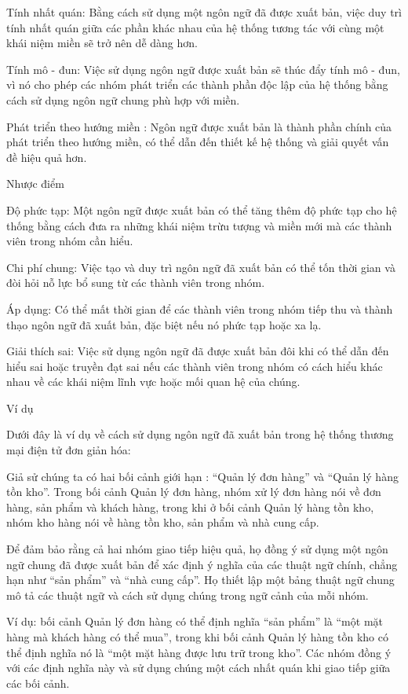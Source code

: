 Tính nhất quán: Bằng cách sử dụng một ngôn ngữ đã được xuất bản, việc duy trì tính nhất quán giữa các phần khác nhau của hệ thống tương tác với cùng một khái niệm miền sẽ trở nên dễ dàng hơn.

Tính mô - đun: Việc sử dụng ngôn ngữ được xuất bản sẽ thúc đẩy tính mô - đun, vì nó cho phép các nhóm phát triển các thành phần độc lập của hệ thống bằng cách sử dụng ngôn ngữ chung phù hợp với miền.

Phát triển theo hướng miền : Ngôn ngữ được xuất bản là thành phần chính của phát triển theo hướng miền, có thể dẫn đến thiết kế hệ thống và giải quyết vấn đề hiệu quả hơn.

Nhược điểm

Độ phức tạp: Một ngôn ngữ được xuất bản có thể tăng thêm độ phức tạp cho hệ thống bằng cách đưa ra những khái niệm trừu tượng và miền mới mà các thành viên trong nhóm cần hiểu.

Chi phí chung: Việc tạo và duy trì ngôn ngữ đã xuất bản có thể tốn thời gian và đòi hỏi nỗ lực bổ sung từ các thành viên trong nhóm.

Áp dụng: Có thể mất thời gian để các thành viên trong nhóm tiếp thu và thành thạo ngôn ngữ đã xuất bản, đặc biệt nếu nó phức tạp hoặc xa lạ.

Giải thích sai: Việc sử dụng ngôn ngữ đã được xuất bản đôi khi có thể dẫn đến hiểu sai hoặc truyền đạt sai nếu các thành viên trong nhóm có cách hiểu khác nhau về các khái niệm lĩnh vực hoặc mối quan hệ của chúng.

Ví dụ

Dưới đây là ví dụ về cách sử dụng ngôn ngữ đã xuất bản trong hệ thống thương mại điện tử đơn giản hóa:

Giả sử chúng ta có hai bối cảnh giới hạn : “Quản lý đơn hàng” và “Quản lý hàng tồn kho”. Trong bối cảnh Quản lý đơn hàng, nhóm xử lý đơn hàng nói về đơn hàng, sản phẩm và khách hàng, trong khi ở bối cảnh Quản lý hàng tồn kho, nhóm kho hàng nói về hàng tồn kho, sản phẩm và nhà cung cấp.

Để đảm bảo rằng cả hai nhóm giao tiếp hiệu quả, họ đồng ý sử dụng một ngôn ngữ chung đã được xuất bản để xác định ý nghĩa của các thuật ngữ chính, chẳng hạn như “sản phẩm” và “nhà cung cấp”. Họ thiết lập một bảng thuật ngữ chung mô tả các thuật ngữ và cách sử dụng chúng trong ngữ cảnh của mỗi nhóm.

Ví dụ: bối cảnh Quản lý đơn hàng có thể định nghĩa “sản phẩm” là “một mặt hàng mà khách hàng có thể mua”, trong khi bối cảnh Quản lý hàng tồn kho có thể định nghĩa nó là “một mặt hàng được lưu trữ trong kho”. Các nhóm đồng ý với các định nghĩa này và sử dụng chúng một cách nhất quán khi giao tiếp giữa các bối cảnh.

